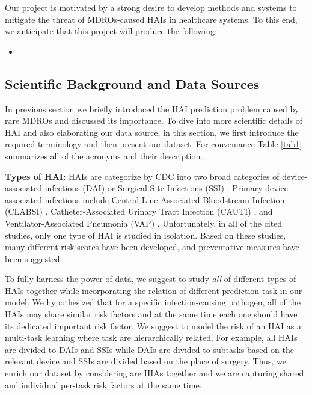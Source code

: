 
Our project is motivated by a strong desire to develop methods and systems to mitigate the threat of MDROs-caused HAIs in healthcare systems. To this end, we anticipate that this project will produce the following:
\begin{itemize}
	\item 
\end{itemize}

\subsection{Scientific Background and Data Sources}
In previous section we briefly introduced the HAI prediction problem caused by rare MDROs and discussed its importance. To dive into more scientific details of HAI and also elaborating our data source, in this section, we first introduce the required terminology and then present our dataset. For conveniance Table \ref{tab1} summarizes all of the acronyms and their description. 

{\bf Types of HAI:}
HAIs are categorize by CDC into two broad categories of device-associated infections (DAI) or Surgical-Site Infections (SSI) \cite{mu2011improving, de2006surgical, friedman2007alternative, chiang2014risk}. Primary device-associated infections include Central Line-Associated Bloodstream Infection (CLABSI) \cite{wylie2010risk, noaman2017improving, schoonover2017accurately, herc2017model, parreco2018predicting}, Catheter-Associated Urinary Tract Infection (CAUTI) \cite{grana2015detection, tambyah2004catheter, siddiq2012new}, and Ventilator-Associated Pneumonia (VAP) \cite{froon1998prediction, larsson2017risk, lisboa2008ventilator, kruger2011prognosis, mirsaeidi2009predicting}. Unfortunately, in all of the cited studies, only one type of HAI is studied in isolation. Based on these studies, many different risk scores have been developed, and preventative measures have been suggested. 

To fully harness the power of data, we suggest to study \emph{all} of different types of HAIs together while incorporating the relation of different prediction task in our model. We hypothesized that for a specific infection-causing pathogen, all of the HAIs may share similar risk factors and at the same time each one should have its dedicated important risk factor. We suggest to model the risk of an HAI as a multi-task learning where task are hierarchically related. For example, all HAIs are divided to DAIs and SSIs while DAIs are divided to subtasks based on the relevant device and SSIs are divided based on the place of surgery. Thus, we enrich our dataset by considering are HIAs together and we are capturing shared and individual per-task risk factors at the same time. 


